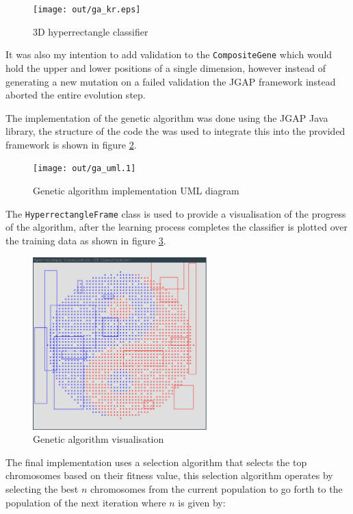 \documentclass[a4paper]{article}
\begin{document}
\begin{figure}[h!]
  \centering
  \texttt{[image: out/ga\_kr.eps]}
  \caption{3D hyperrectangle classifier}
  \label{fig:ga_kr}
\end{figure}

It was also my intention to add validation to the \texttt{CompositeGene} which
would hold the upper and lower positions of a single dimension, however instead
of generating a new mutation on a failed validation the JGAP framework instead
aborted the entire evolution step.

The implementation of the genetic algorithm was done using the JGAP \cite{jgap}
Java library, the structure of the code the was used to integrate this into the
provided framework is shown in figure \ref{fig:ga_uml}.

\begin{figure}[h!]
  \centering
  \texttt{[image: out/ga\_uml.1]}
  \caption{Genetic algorithm implementation UML diagram}
  \label{fig:ga_uml}
\end{figure}

The \texttt{HyperrectangleFrame} class is used to provide a visualisation of the
progress of the algorithm, after the learning process completes the classifier
is plotted over the training data as shown in figure \ref{fig:ga_vis}.

\begin{figure}[h!]
  \centering
  \includegraphics[width=0.6\textwidth]{graphics/ga_vis.eps}
  \caption{Genetic algorithm visualisation}
  \label{fig:ga_vis}
\end{figure}

The final implementation uses a selection algorithm that selects the top
chromosomes based on their fitness value, this selection algorithm operates by
selecting the best $n$ chromosomes from the current population to go forth to
the population of the next iteration where $n$ is given by:
\end{document}
